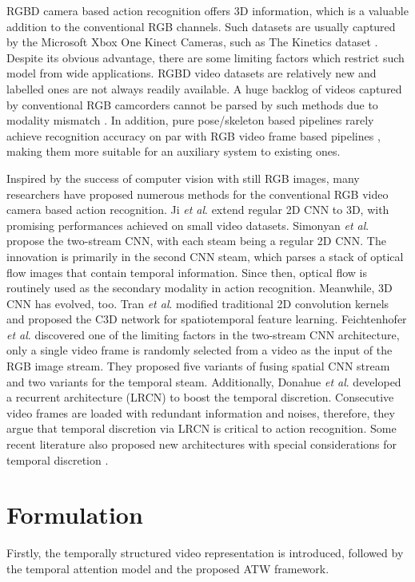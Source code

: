 \documentclass[runningheads,a4paper]{llncs}
\begin{document}
RGBD camera based action recognition offers 3D information, which is a valuable addition to the conventional RGB channels.
Such datasets are usually captured by the Microsoft Xbox One Kinect Cameras, such as The Kinetics dataset \cite{cheron2015p}.
Despite its obvious advantage, there are some limiting factors which restrict such model from wide applications. RGBD video
datasets are relatively new and labelled ones are not always readily available. A huge backlog of videos captured by
conventional RGB camcorders cannot be parsed by such methods due to modality mismatch \cite{zhang2015multi}. In addition, pure pose/skeleton based pipelines rarely achieve
recognition accuracy on par with RGB video frame based pipelines \cite{zhang2015can,zhang2015auxiliary}, making them more suitable for an auxiliary system to
existing ones.


Inspired by the success of computer vision with still RGB images, many researchers have proposed numerous methods for the
conventional RGB video camera based action recognition. Ji \textit{et al}. \cite{ji20133d} extend regular 2D CNN to 3D, with
promising performances achieved on small video datasets. Simonyan \textit{et al}. \cite{simonyan2014two} propose the two-stream
CNN, with each steam being a regular 2D CNN. The innovation is primarily in the second CNN steam, which parses a stack of optical
flow images that contain temporal information. Since then, optical flow is routinely used as the secondary modality in action
recognition. Meanwhile, 3D CNN has evolved, too. Tran \textit{et al}. \cite{tran2015learning} modified traditional 2D convolution
kernels and proposed the C3D network for spatiotemporal feature learning. Feichtenhofer \textit{et al}.
\cite{feichtenhofer2016convolutional} discovered one of the limiting factors in the two-stream CNN architecture, only a
single video frame is randomly selected from a video as the input of the RGB image stream. They proposed five variants of fusing
spatial CNN stream and two variants for the temporal steam. Additionally, Donahue \textit{et al}. \cite{donahue2015long}
developed a recurrent architecture (LRCN) to boost the temporal discretion. Consecutive video frames are loaded with redundant
information and noises, therefore, they argue that temporal discretion via LRCN is critical to action recognition. Some recent
literature also proposed new architectures with special considerations for temporal discretion
\cite{wang2016temporal,yao2015describing,gaidon2013temporal,huang2018video}.
%
%
%
\section{Formulation}%
Firstly, the temporally structured video representation is introduced, followed by the temporal attention model and the proposed ATW framework.
%
\end{document}
